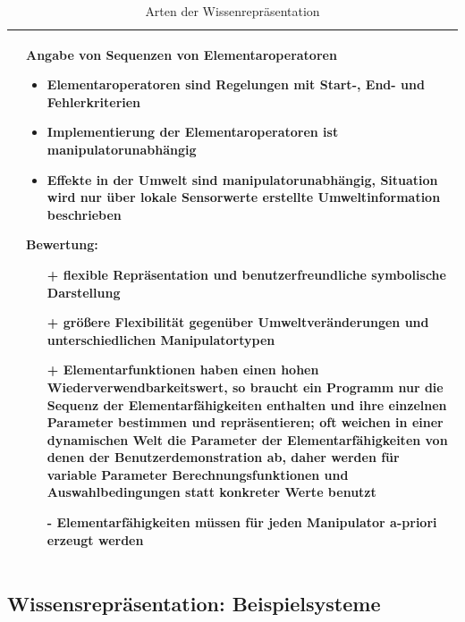 \begin{table}[hbt]
\begin{tabular}{|p{8cm}|p{8cm}|}
\begin{itemize}
\end{itemize}
 &
 Angabe von Sequenzen von Elementaroperatoren
 \vspace{-4mm}
\begin{itemize}
\setlength\itemsep{0em}
\item Elementaroperatoren sind Regelungen mit Start-, End- und Fehlerkriterien
\item Implementierung der Elementaroperatoren ist manipulatorunabhängig
\item Effekte in der Umwelt sind manipulatorunabhängig, Situation wird nur über lokale Sensorwerte erstellte Umweltinformation beschrieben
\end{itemize}
Bewertung:
\begin{itemize}
\setlength\itemsep{0em}
\item[+] flexible Repräsentation und benutzerfreundliche symbolische Darstellung
\item[+] größere Flexibilität gegenüber Umweltveränderungen und unterschiedlichen Manipulatortypen
\item[+] Elementarfunktionen haben einen hohen Wiederverwendbarkeitswert, so braucht ein Programm nur die Sequenz der Elementarfähigkeiten
enthalten und ihre einzelnen Parameter bestimmen und repräsentieren;  oft weichen in einer
dynamischen Welt die Parameter der Elementarfähigkeiten von denen der Benutzerdemonstration ab, daher werden für variable Parameter Berechnungsfunktionen und
Auswahlbedingungen statt konkreter Werte benutzt
\item[-] Elementarfähigkeiten müssen für jeden Manipulator a-priori erzeugt werden 
\end{itemize}\\
\hline
\end{tabular}
\caption{Arten der Wissenrepräsentation}
\label{tab:Wissrep}
\end{table}

\subsection{Wissensrepräsentation: Beispielsysteme}
